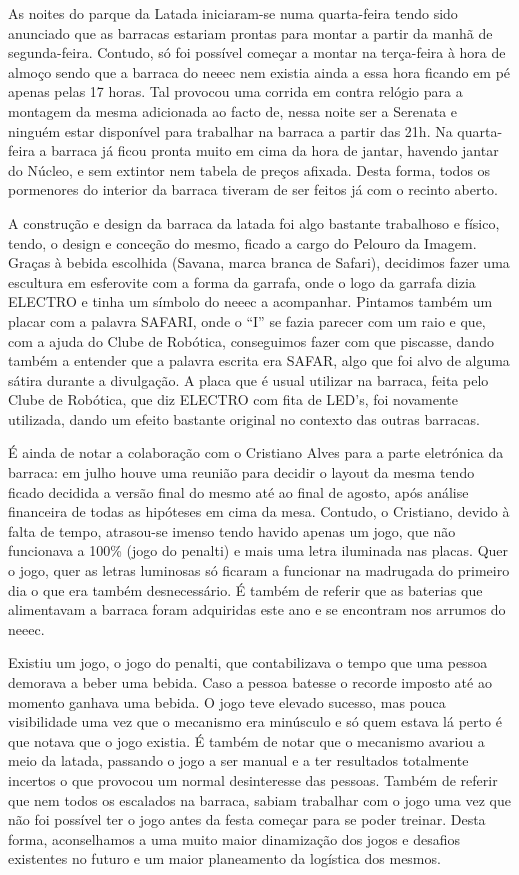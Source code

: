 As noites do parque da Latada iniciaram-se numa quarta-feira tendo sido anunciado que as barracas estariam prontas para montar a partir da manhã de segunda-feira. Contudo, só foi possível começar a montar na terça-feira à hora de almoço sendo que a barraca do \acrshort{neeec} nem existia ainda a essa hora ficando em pé apenas pelas 17 horas. Tal provocou uma corrida em contra relógio para a montagem da mesma adicionada ao facto de, nessa noite ser a Serenata e ninguém estar disponível para trabalhar na barraca a partir das 21h. Na quarta-feira a barraca já ficou pronta muito em cima da hora de jantar, havendo jantar do Núcleo, e sem extintor nem tabela de preços afixada. Desta forma, todos os pormenores do interior da barraca tiveram de ser feitos já com o recinto aberto.

A construção e design da barraca da latada foi algo bastante trabalhoso e físico, tendo, o design e conceção do mesmo, ficado a cargo do Pelouro da Imagem. Graças à bebida escolhida (Savana, marca branca de Safari), decidimos fazer uma escultura em esferovite com a forma da garrafa, onde o logo da garrafa dizia ELECTRO e tinha um símbolo do \acrshort{neeec} a acompanhar. Pintamos também um placar com a palavra SAFARI, onde o “I” se fazia parecer com um raio e que, com a ajuda do Clube de Robótica, conseguimos fazer com que piscasse, dando também a entender que a palavra escrita era SAFAR, algo que foi alvo de alguma sátira durante a divulgação. A placa que é usual utilizar na barraca, feita pelo Clube de Robótica, que diz ELECTRO com fita de LED’s, foi novamente utilizada, dando um efeito bastante original no contexto das outras barracas.

É ainda de notar a colaboração com o Cristiano Alves para a parte eletrónica da barraca: em julho houve uma reunião para decidir o layout da mesma tendo ficado decidida a versão final do mesmo até ao final de agosto, após análise financeira de todas as hipóteses em cima da mesa. Contudo, o Cristiano, devido à falta de tempo, atrasou-se imenso tendo havido apenas um jogo, que não funcionava a 100\% (jogo do penalti) e mais uma letra iluminada nas placas. Quer o jogo, quer as letras luminosas só ficaram a funcionar na madrugada do primeiro dia o que era também desnecessário. É também de referir que as baterias que alimentavam a barraca foram adquiridas este ano e se encontram nos arrumos do \acrshort{neeec}.

Existiu um jogo, o jogo do penalti, que contabilizava o tempo que uma pessoa demorava a beber uma bebida. Caso a pessoa batesse o recorde imposto até ao momento ganhava uma bebida. O jogo teve elevado sucesso, mas pouca visibilidade uma vez que o mecanismo era minúsculo e só quem estava lá perto é que notava que o jogo existia. É também de notar que o mecanismo avariou a meio da latada, passando o jogo a ser manual e a ter resultados totalmente incertos o que provocou um normal desinteresse das pessoas. Também de referir que nem todos os escalados na barraca, sabiam trabalhar com o jogo uma vez que não foi possível ter o jogo antes da festa começar para se poder treinar. Desta forma, aconselhamos a uma muito maior dinamização dos jogos e desafios existentes no futuro e um maior planeamento da logística dos mesmos.

